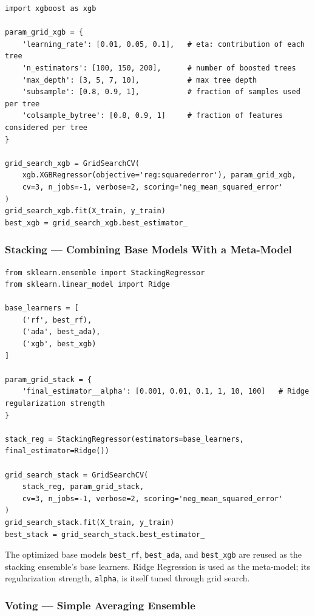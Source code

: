 \documentclass[12pt,openany]{book}
\begin{document}
\begin{Verbatim}[breaklines=true,breakanywhere=true,fontsize=\small]
import xgboost as xgb

param_grid_xgb = {
    'learning_rate': [0.01, 0.05, 0.1],   # eta: contribution of each tree
    'n_estimators': [100, 150, 200],      # number of boosted trees
    'max_depth': [3, 5, 7, 10],           # max tree depth
    'subsample': [0.8, 0.9, 1],           # fraction of samples used per tree
    'colsample_bytree': [0.8, 0.9, 1]     # fraction of features considered per tree
}

grid_search_xgb = GridSearchCV(
    xgb.XGBRegressor(objective='reg:squarederror'), param_grid_xgb,
    cv=3, n_jobs=-1, verbose=2, scoring='neg_mean_squared_error'
)
grid_search_xgb.fit(X_train, y_train)
best_xgb = grid_search_xgb.best_estimator_
\end{Verbatim}

\subsubsection{Stacking --- Combining Base Models With a Meta-Model}

\begin{Verbatim}[breaklines=true,breakanywhere=true,fontsize=\small]
from sklearn.ensemble import StackingRegressor
from sklearn.linear_model import Ridge

base_learners = [
    ('rf', best_rf),
    ('ada', best_ada),
    ('xgb', best_xgb)
]

param_grid_stack = {
    'final_estimator__alpha': [0.001, 0.01, 0.1, 1, 10, 100]   # Ridge regularization strength
}

stack_reg = StackingRegressor(estimators=base_learners, final_estimator=Ridge())

grid_search_stack = GridSearchCV(
    stack_reg, param_grid_stack,
    cv=3, n_jobs=-1, verbose=2, scoring='neg_mean_squared_error'
)
grid_search_stack.fit(X_train, y_train)
best_stack = grid_search_stack.best_estimator_
\end{Verbatim}

The optimized base models \texttt{best\_rf}, \texttt{best\_ada}, and \texttt{best\_xgb} are reused as the stacking ensemble's base learners. Ridge Regression is used as the meta-model; its regularization strength, \texttt{alpha}, is itself tuned through grid search.

\subsubsection{Voting --- Simple Averaging Ensemble}
\end{document}
